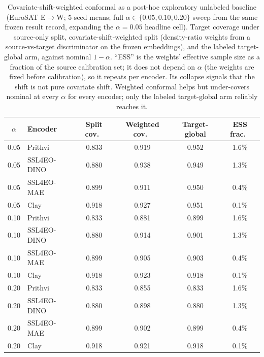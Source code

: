 \documentclass[11pt]{article}
\begin{document}
\begin{table}[t]\centering\small
\caption{Covariate-shift-weighted conformal \citep{tibshirani2019covariate} as a post-hoc exploratory
unlabeled baseline (EuroSAT E$\to$W; 5-seed means; full $\alpha\in\{0.05,0.10,0.20\}$ sweep from the same
frozen result record, expanding the $\alpha{=}0.05$ headline cell). Target coverage under source-only
split, covariate-shift-weighted split (density-ratio weights from a source-vs-target discriminator on the
frozen embeddings), and the labeled target-global arm, against nominal $1{-}\alpha$. ``ESS'' is the
weights' effective sample size as a fraction of the source calibration set; it does not depend on $\alpha$
(the weights are fixed before calibration), so it repeats per encoder. Its collapse signals that the shift
is not pure covariate shift. Weighted conformal helps but under-covers nominal at every $\alpha$ for every
encoder; only the labeled target-global arm reliably reaches it.}\label{tab:weighted}
\begin{tabular}{clcccc}
\toprule
$\alpha$ & Encoder & Split cov.\ & Weighted cov.\ & Target-global & ESS frac.\ \\
\midrule
0.05 & Prithvi     & 0.833 & 0.919 & 0.952 & 1.6\% \\
0.05 & SSL4EO-DINO & 0.880 & 0.938 & 0.949 & 1.3\% \\
0.05 & SSL4EO-MAE  & 0.899 & 0.911 & 0.950 & 0.4\% \\
0.05 & Clay        & 0.918 & 0.927 & 0.951 & 0.1\% \\
\midrule
0.10 & Prithvi     & 0.833 & 0.881 & 0.899 & 1.6\% \\
0.10 & SSL4EO-DINO & 0.880 & 0.914 & 0.901 & 1.3\% \\
0.10 & SSL4EO-MAE  & 0.899 & 0.905 & 0.903 & 0.4\% \\
0.10 & Clay        & 0.918 & 0.923 & 0.918 & 0.1\% \\
\midrule
0.20 & Prithvi     & 0.833 & 0.855 & 0.833 & 1.6\% \\
0.20 & SSL4EO-DINO & 0.880 & 0.898 & 0.880 & 1.3\% \\
0.20 & SSL4EO-MAE  & 0.899 & 0.902 & 0.899 & 0.4\% \\
0.20 & Clay        & 0.918 & 0.921 & 0.918 & 0.1\% \\
\bottomrule
\end{tabular}
\end{table}
\end{document}
